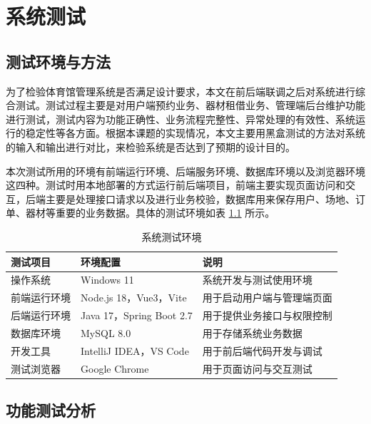 
\chapter{系统测试}

\section{测试环境与方法}

为了检验体育馆管理系统是否满足设计要求，本文在前后端联调之后对系统进行综合测试。测试过程主要是对用户端预约业务、器材租借业务、管理端后台维护功能进行测试，测试内容为功能正确性、业务流程完整性、异常处理的有效性、系统运行的稳定性等各方面。根据本课题的实现情况，本文主要用黑盒测试的方法对系统的输入和输出进行对比，来检验系统是否达到了预期的设计目的\cite{zhao2026}。

本次测试所用的环境有前端运行环境、后端服务环境、数据库环境以及浏览器环境这四种。测试时用本地部署的方式运行前后端项目，前端主要实现页面访问和交互，后端主要是处理接口请求以及进行业务校验，数据库用来保存用户、场地、订单、器材等重要的业务数据。具体的测试环境如表 \ref{tab:test-env} 所示。

\begin{table}[htbp]
\centering
\caption{系统测试环境}
\label{tab:test-env}
\small
\begin{tabularx}{\textwidth}{p{3.2cm}p{4cm}X}
\toprule
测试项目 & 环境配置 & 说明 \\
\midrule
操作系统 & Windows 11 & 系统开发与测试使用环境 \\
前端运行环境 & Node.js 18，Vue3，Vite & 用于启动用户端与管理端页面 \\
后端运行环境 & Java 17，Spring Boot 2.7 & 用于提供业务接口与权限控制 \\
数据库环境 & MySQL 8.0 & 用于存储系统业务数据 \\
开发工具 & IntelliJ IDEA，VS Code & 用于前后端代码开发与调试 \\
测试浏览器 & Google Chrome & 用于页面访问与交互测试 \\
\bottomrule
\end{tabularx}
\end{table}

\section{功能测试分析}

